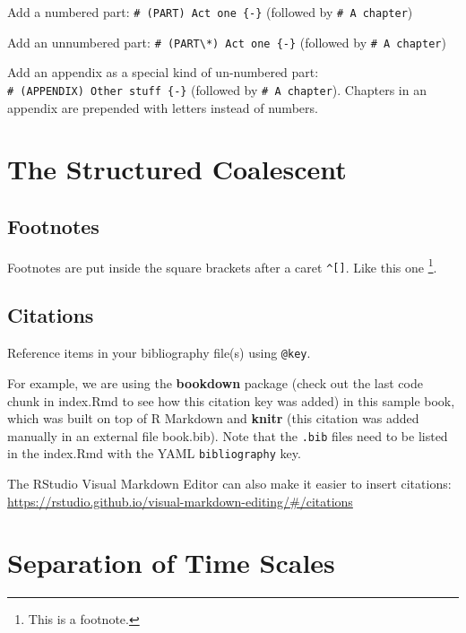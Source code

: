 \documentclass[
]{book}
\theoremstyle{definition}
\theoremstyle{definition}
\theoremstyle{definition}
\theoremstyle{definition}
\theoremstyle{remark}
\begin{document}
Add a numbered part: \texttt{\#\ (PART)\ Act\ one\ \{-\}} (followed by \texttt{\#\ A\ chapter})

Add an unnumbered part: \texttt{\#\ (PART\textbackslash{}*)\ Act\ one\ \{-\}} (followed by \texttt{\#\ A\ chapter})

Add an appendix as a special kind of un-numbered part: \texttt{\#\ (APPENDIX)\ Other\ stuff\ \{-\}} (followed by \texttt{\#\ A\ chapter}). Chapters in an appendix are prepended with letters instead of numbers.

\hypertarget{the-structured-coalescent}{%
\chapter{The Structured Coalescent}\label{the-structured-coalescent}}

\hypertarget{footnotes}{%
\section{Footnotes}\label{footnotes}}

Footnotes are put inside the square brackets after a caret \texttt{\^{}{[}{]}}. Like this one \footnote{This is a footnote.}.

\hypertarget{citations}{%
\section{Citations}\label{citations}}

Reference items in your bibliography file(s) using \texttt{@key}.

For example, we are using the \textbf{bookdown} package \citep{R-bookdown} (check out the last code chunk in index.Rmd to see how this citation key was added) in this sample book, which was built on top of R Markdown and \textbf{knitr} \citep{xie2015} (this citation was added manually in an external file book.bib).
Note that the \texttt{.bib} files need to be listed in the index.Rmd with the YAML \texttt{bibliography} key.

The RStudio Visual Markdown Editor can also make it easier to insert citations: \url{https://rstudio.github.io/visual-markdown-editing/\#/citations}

\hypertarget{separation-of-time-scales}{%
\chapter{Separation of Time Scales}\label{separation-of-time-scales}}
\end{document}
